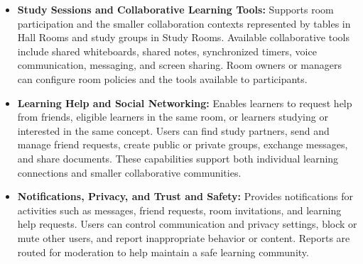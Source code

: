 \documentclass[12pt]{article}
\begin{document}
\begin{itemize}
\par
\item \textbf{Study Sessions and Collaborative Learning Tools:} Supports room participation and the smaller collaboration contexts represented by tables in Hall Rooms and study groups in Study Rooms. Available collaborative tools include shared whiteboards, shared notes, synchronized timers, voice communication, messaging, and screen sharing. Room owners or managers can configure room policies and the tools available to participants.
\par
\item \textbf{Learning Help and Social Networking:} Enables learners to request help from friends, eligible learners in the same room, or learners studying or interested in the same concept. Users can find study partners, send and manage friend requests, create public or private groups, exchange messages, and share documents. These capabilities support both individual learning connections and smaller collaborative communities.
\par
\item \textbf{Notifications, Privacy, and Trust and Safety:} Provides notifications for activities such as messages, friend requests, room invitations, and learning help requests. Users can control communication and privacy settings, block or mute other users, and report inappropriate behavior or content. Reports are routed for moderation to help maintain a safe learning community.
\par
\end{itemize}
\hypertarget{sec:external-interfaces-and-operating-environment}{}
\end{document}
